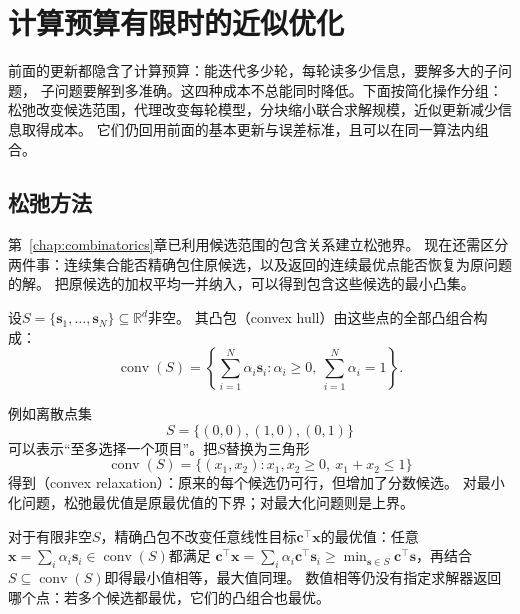 \section{计算预算有限时的近似优化}
\label{sec:opt-approximate-optimization}

前面的更新都隐含了计算预算：能迭代多少轮，每轮读多少信息，要解多大的子问题，
子问题要解到多准确。这四种成本不总能同时降低。下面按简化操作分组：
松弛改变候选范围，代理改变每轮模型，分块缩小联合求解规模，近似更新减少信息取得成本。
它们仍回用前面的基本更新与误差标准，且可以在同一算法内组合。

\subsection{松弛方法}
\label{sec:opt-relaxations-certificates}

第~\ref{chap:combinatorics}章已利用候选范围的包含关系建立松弛界。
现在还需区分两件事：连续集合能否精确包住原候选，以及返回的连续最优点能否恢复为原问题的解。
把原候选的加权平均一并纳入，可以得到包含这些候选的最小凸集。

\begin{definition}[有限点集的凸包]
\label{def:opt-convex-hull}
设$S=\{\bm s_1,\ldots,\bm s_N\}\subseteq\mathbb R^d$非空。
其凸包（convex hull）由这些点的全部凸组合构成：
\[
  \operatorname{conv}(S)
  =\left\{\sum_{i=1}^N\alpha_i\bm s_i:
  \alpha_i\geq0,\ \sum_{i=1}^N\alpha_i=1\right\}.
\]
\end{definition}
例如离散点集
\[
  S=\{(0,0),(1,0),(0,1)\}
\]
可以表示“至多选择一个项目”。把$S$替换为三角形
\[
  \operatorname{conv}(S)
  =\{(x_1,x_2):x_1,x_2\geq0,\ x_1+x_2\leq1\}
\]
得到（convex relaxation）：原来的每个候选仍可行，但增加了分数候选。
对最小化问题，松弛最优值是原最优值的下界；对最大化问题则是上界。

对于有限非空$S$，精确凸包不改变任意线性目标$\bm{c}^{\top}\bm{x}$的最优值：任意
$\bm{x}=\sum_i\alpha_i\bm{s}_i\in\operatorname{conv}(S)$都满足
$\bm{c}^{\top}\bm{x}=\sum_i\alpha_i\bm{c}^{\top}\bm{s}_i
\geq\min_{\bm{s}\in S}\bm{c}^{\top}\bm{s}$，再结合
$S\subseteq\operatorname{conv}(S)$即得最小值相等，最大值同理。
数值相等仍没有指定求解器返回哪个点：若多个候选都最优，它们的凸组合也最优。

